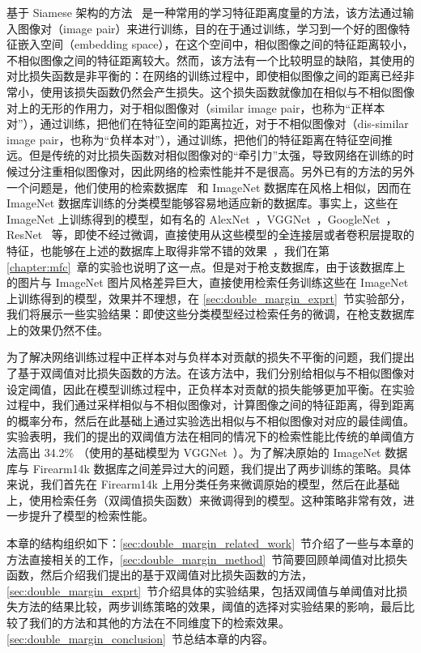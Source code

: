 基于 Siamese 架构的方法~\cite{Radenovic2016CNNIR,Chopra2005LearningAS,Bell2015LearningVS} 是一种常用的学习特征距离度量的方法，该方法通过输入图像对（image pair）来进行训练，目的在于通过训练，学习到一个好的图像特征嵌入空间（embedding space），在这个空间中，相似图像之间的特征距离较小，不相似图像之间的特征距离较大。然而，该方法有一个比较明显的缺陷，其使用的对比损失函数是非平衡的：在网络的训练过程中，即使相似图像之间的距离已经非常小，使用该损失函数仍然会产生损失。这个损失函数就像加在相似与不相似图像对上的无形的作用力，对于相似图像对（similar image pair，也称为“正样本对”），通过训练，把他们在特征空间的距离拉近，对于不相似图像对（dis-similar image pair，也称为“负样本对”），通过训练，把他们的特征距离在特征空间推远。但是传统的对比损失函数对相似图像对的“牵引力”太强，导致网络在训练的时候过分注重相似图像对，因此网络的检索性能并不是很高。另外已有的方法的另外一个问题是，他们使用的检索数据库~\cite{Philbin2007ObjectRW,Philbin2008LostIQ} 和 ImageNet 数据库在风格上相似，因而在 ImageNet 数据库训练的分类模型能够容易地适应新的数据库。事实上，这些在 ImageNet 上训练得到的模型，如有名的 AlexNet~\cite{Krizhevsky2012ImageNetCW}，VGGNet~\cite{Simonyan2014VeryDC}，GoogleNet~\cite{Szegedy2015GoingDW}，ResNet~\cite{He2016DeepRL} 等，即使不经过微调，直接使用从这些模型的全连接层或者卷积层提取的特征，也能够在上述的数据库上取得非常不错的效果~\cite{Babenko2014NeuralCF,Babenko2015AggregatingLD,Tolias2015ParticularOR}，我们在第 \ref{chapter:mfc}~章的实验也说明了这一点。但是对于枪支数据库，由于该数据库上的图片与 ImageNet 图片风格差异巨大，直接使用检索任务训练这些在 ImageNet 上训练得到的模型，效果并不理想，在 \ref{sec:double_margin_exprt}~节实验部分，我们将展示一些实验结果：即使这些分类模型经过检索任务的微调，在枪支数据库上的效果仍然不佳。

为了解决网络训练过程中正样本对与负样本对贡献的损失不平衡的问题，我们提出了基于双阈值对比损失函数的方法。在该方法中，我们分别给相似与不相似图像对设定阈值，因此在模型训练过程中，正负样本对贡献的损失能够更加平衡。在实验过程中，我们通过采样相似与不相似图像对，计算图像之间的特征距离，得到距离的概率分布，然后在此基础上通过实验选出相似与不相似图像对对应的最佳阈值。实验表明，我们的提出的双阈值方法在相同的情况下的检索性能比传统的单阈值方法高出 34.2\% （使用的基础模型为 VGGNet~\cite{Simonyan2014VeryDC}）。为了解决原始的 ImageNet 数据库与 Firearm14k 数据库之间差异过大的问题，我们提出了两步训练的策略。具体来说，我们首先在 Firearm14k 上用分类任务来微调原始的模型，然后在此基础上，使用检索任务（双阈值损失函数）来微调得到的模型。这种策略非常有效，进一步提升了模型的检索性能。

本章的结构组织如下：\ref{sec:double_margin_related_work}~节介绍了一些与本章的方法直接相关的工作，\ref{sec:double_margin_method}~节简要回顾单阈值对比损失函数，然后介绍我们提出的基于双阈值对比损失函数的方法，\ref{sec:double_margin_exprt}~节介绍具体的实验结果，包括双阈值与单阈值对比损失方法的结果比较，两步训练策略的效果，阈值的选择对实验结果的影响，最后比较了我们的方法和其他的方法在不同维度下的检索效果。\ref{sec:double_margin_conclusion}~节总结本章的内容。

